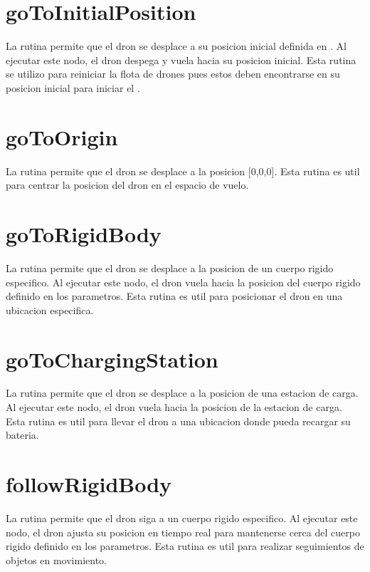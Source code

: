 \documentclass[a4paper,11pt,spanish]{sphinxmanual}
\begin{document}
\section{goToInitialPosition}
\label{\detokenize{rutinas_individuales:gotoinitialposition}}
\sphinxAtStartPar
La rutina  permite que el dron se desplace a su posicion inicial definida en . Al ejecutar este nodo, el dron despega y vuela hacia su posicion inicial. Esta rutina se utilizo para reiniciar la flota de drones pues estos deben encontrarse en su posicion inicial para iniciar el .


\section{goToOrigin}
\label{\detokenize{rutinas_individuales:gotoorigin}}
\sphinxAtStartPar
La rutina  permite que el dron se desplace a la posicion {[}0,0,0{]}. Esta rutina es util para centrar la posicion del dron en el espacio de vuelo.


\section{goToRigidBody}
\label{\detokenize{rutinas_individuales:gotorigidbody}}
\sphinxAtStartPar
La rutina  permite que el dron se desplace a la posicion de un cuerpo rigido especifico. Al ejecutar este nodo, el dron vuela hacia la posicion del cuerpo rigido definido en los parametros. Esta rutina es util para posicionar el dron en una ubicacion especifica.


\section{goToChargingStation}
\label{\detokenize{rutinas_individuales:gotochargingstation}}
\sphinxAtStartPar
La rutina  permite que el dron se desplace a la posicion de una estacion de carga. Al ejecutar este nodo, el dron vuela hacia la posicion de la estacion de carga. Esta rutina es util para llevar el dron a una ubicacion donde pueda recargar su bateria.


\section{followRigidBody}
\label{\detokenize{rutinas_individuales:followrigidbody}}
\sphinxAtStartPar
La rutina  permite que el dron siga a un cuerpo rigido especifico. Al ejecutar este nodo, el dron ajusta su posicion en tiempo real para mantenerse cerca del cuerpo rigido definido en los parametros. Esta rutina es util para realizar seguimientos de objetos en movimiento.
\end{document}
